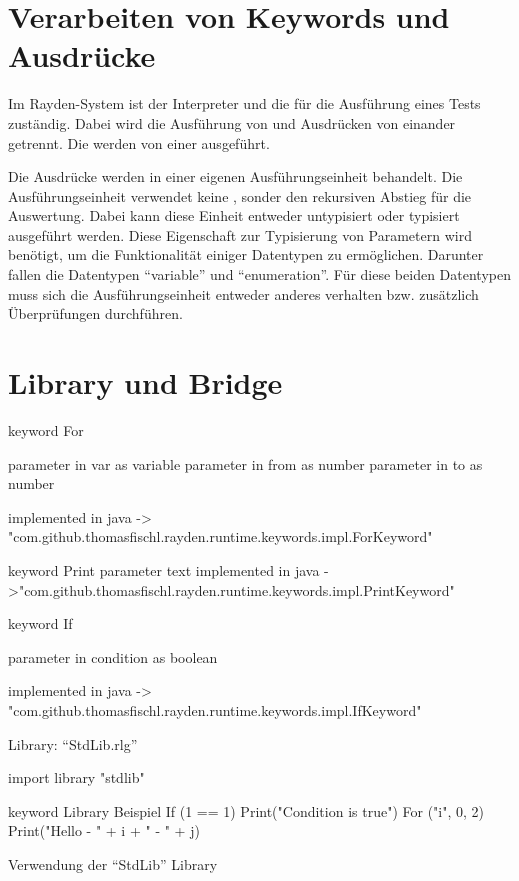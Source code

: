 \section{Verarbeiten von Keywords und Ausdrücke}

Im Rayden-System ist der Interpreter und die  für die Ausführung eines Tests zuständig. Dabei wird die Ausführung von  und Ausdrücken von einander getrennt. Die  werden von einer  ausgeführt. 

\SuperPar
Die Ausdrücke werden in einer eigenen Ausführungseinheit behandelt. Die Ausführungseinheit verwendet keine , sonder den rekursiven Abstieg für die Auswertung. Dabei kann diese Einheit entweder untypisiert oder typisiert ausgeführt werden. Diese Eigenschaft zur Typisierung von Parametern wird benötigt, um die Funktionalität einiger Datentypen zu ermöglichen. Darunter fallen die Datentypen "`variable"' und "`enumeration"'. Für diese beiden Datentypen muss sich die Ausführungseinheit entweder anderes verhalten bzw. zusätzlich Überprüfungen durchführen. 

\section{Library und Bridge}


\begin{program}
\begin{JavaCode}
keyword For { 
	parameter in var as variable
	parameter in from as number
	parameter in to as number

	implemented in java -> "com.github.thomasfischl.rayden.runtime.keywords.impl.ForKeyword"
}

keyword Print {
	parameter text
	implemented in java ->"com.github.thomasfischl.rayden.runtime.keywords.impl.PrintKeyword"
}

keyword If { 
	parameter in condition as boolean

	implemented in java -> "com.github.thomasfischl.rayden.runtime.keywords.impl.IfKeyword"
}
\end{JavaCode}
\caption{Library: "`StdLib.rlg"'}
\label{prog:or}
\end{program}

\begin{program}
\begin{JavaCode}
import library "stdlib"

keyword Library Beispiel {
	If (1 == 1){
		Print("Condition is true")
	}
	For ("i", 0, 2){
		Print("Hello - " + i + " - " + j)
	}
}
\end{JavaCode}
\caption{Verwendung der "`StdLib"' Library}
\label{prog:or}
\end{program}

